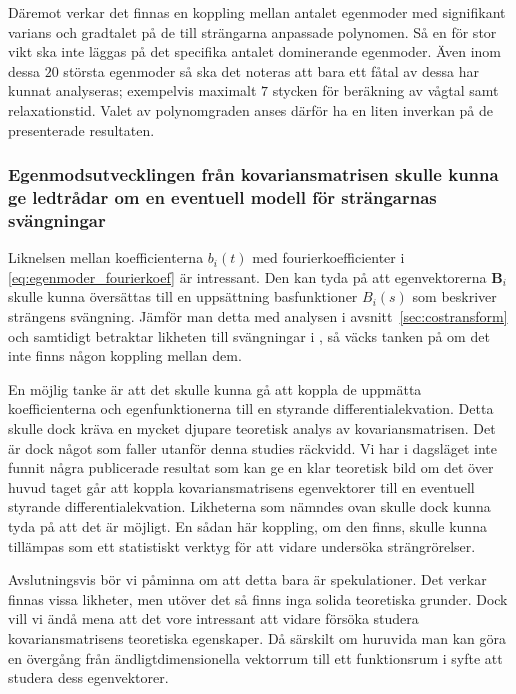 Däremot verkar det finnas en koppling mellan antalet egenmoder med signifikant varians och gradtalet på de till strängarna anpassade polynomen. Så en för stor vikt ska inte läggas på det specifika antalet dominerande egenmoder. Även inom dessa $20$ största egenmoder så ska det noteras att bara ett fåtal av dessa har kunnat analyseras; exempelvis maximalt $7$ stycken för beräkning av vågtal samt relaxationstid. Valet av polynomgraden anses därför ha en liten inverkan på de presenterade resultaten.


\subsubsection{Egenmodsutvecklingen från kovariansmatrisen skulle kunna ge ledtrådar om en eventuell modell för strängarnas svängningar}
\label{disk:kovmatris}
Liknelsen mellan koefficienterna $b_i(t)$ med fourierkoefficienter i \eqref{eq:egenmoder_fourierkoef} är intressant. Den kan tyda på att egenvektorerna $\mathbf{B}_i$ skulle kunna översättas till en uppsättning basfunktioner $B_i(s)$ som beskriver strängens svängning. 
Jämför man detta med analysen i avsnitt~\ref{sec:costransform} och samtidigt betraktar likheten till svängningar i , så väcks tanken på om det inte finns någon koppling mellan dem.

En möjlig tanke är att det skulle kunna gå att  koppla de uppmätta koefficienterna och egenfunktionerna till en styrande differentialekvation. Detta skulle dock kräva en mycket djupare teoretisk analys av kovariansmatrisen. %
Det är dock något som faller utanför denna studies räckvidd.
Vi har i dagsläget inte funnit några publicerade resultat som kan ge en klar teoretisk bild om det över huvud taget går att koppla kovariansmatrisens egenvektorer till en eventuell styrande differentialekvation. Likheterna som nämndes ovan skulle dock kunna tyda på att det är möjligt.
En sådan här koppling, om den finns, skulle kunna tillämpas som ett statistiskt verktyg för att vidare undersöka strängrörelser.

Avslutningsvis bör vi påminna om att detta bara är spekulationer. Det verkar finnas vissa likheter, men utöver det så finns inga solida teoretiska grunder. Dock vill vi ändå mena att det vore intressant att vidare försöka studera kovariansmatrisens teoretiska egenskaper. Då särskilt om huruvida man kan göra en övergång från ändligtdimensionella vektorrum till ett funktionsrum i syfte att studera dess egenvektorer. 


